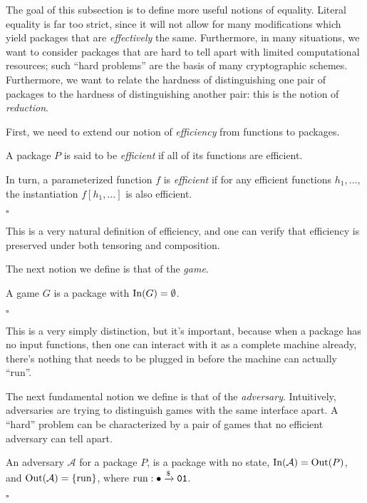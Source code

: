 The goal of this subsection is to define more useful notions of equality.
Literal equality is far too strict, since it will not allow
for many modifications which yield packages that are \emph{effectively}
the same.
Furthermore, in many situations, we want to consider packages
that are hard to tell apart with limited computational resources;
such ``hard problems'' are the basis of many cryptographic schemes.
Furthermore, we want to relate the hardness of distinguishing
one pair of packages to the hardness of distinguishing another pair:
this is the notion of \emph{reduction}.

First, we need to extend our notion of \emph{efficiency}
from functions to packages.

\begin{definition}
    A package $P$ is said to be \emph{efficient} if all of its
    functions are efficient.

    In turn, a parameterized function $f$ is \emph{efficient}
    if for any efficient functions $h_1, \ldots$, the instantiation
    $f[h_1, \ldots]$ is also efficient.

    $\square$
\end{definition}

This is a very natural definition of efficiency,
and one can verify that efficiency is preserved under both
tensoring and composition.

The next notion we define is that of the \emph{game}.
\begin{definition}[Game]
    A game $G$ is a package with $\text{In}(G) = \emptyset$.

    $\square$
\end{definition}

This is a very simply distinction, but it's important,
because when a package has no input functions, then one can interact
with it as a complete machine already, there's nothing that needs
to be plugged in before the machine can actually ``run''.

The next fundamental notion we define is that of the \emph{adversary}.
Intuitively, adversaries are trying to distinguish games with the same
interface apart.
A ``hard'' problem can be characterized by a pair of games that
no efficient adversary can tell apart.

\begin{definition}[Adversaries]
    An adversary $\mathcal{A}$ for a package $P$, is a package
    with no state, $\text{In}(\mathcal{A}) = \text{Out}(P)$, and $\text{Out}(\mathcal{A}) = \{\text{run}\}$,
    where $\text{run} : \bullet \xrightarrow{\$} \texttt{01}$.

    $\square$
\end{definition}

